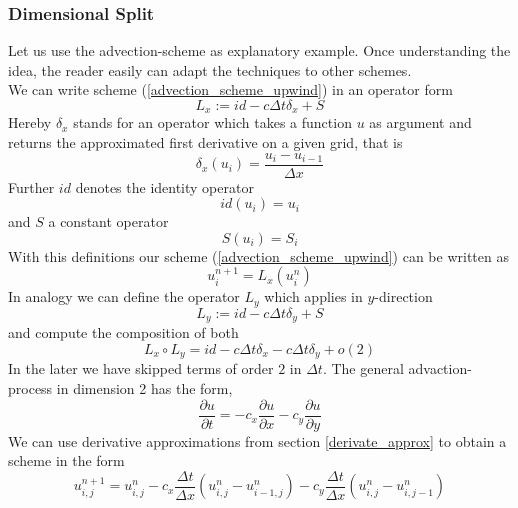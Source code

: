 \documentclass[]{article}
\begin{document}
\subsubsection{Dimensional Split}
Let us use the advection-scheme as explanatory example. Once understanding the idea, the reader easily can adapt the techniques to other schemes.\\
We can write scheme (\ref{advection_scheme_upwind}) in an operator form
\begin{equation*}
L_{x} := id - c\Delta t \delta_{x}+S
\end{equation*}
Hereby $\delta_{x}$ stands for an operator which takes a function $u$ as argument and 
returns the approximated first derivative on a given grid, that is
\begin{equation*}
\delta_{x}(u_{i}) = \frac{u_{i}-u_{i-1}}{\Delta x}
\end{equation*}
Further $id$ denotes the identity operator
\begin{equation*}
id(u_{i})=u_{i}
\end{equation*}
 and $S$ a constant operator
\begin{equation*}
S(u_{i})=S_{i}
\end{equation*}
With this definitions our scheme (\ref{advection_scheme_upwind}) can be written as
\begin{equation*}
u^{n+1}_{i} = L_{x}(u^{n}_{i})
\end{equation*}
In analogy we can define the operator $L_{y}$ which applies in $y$-direction
\begin{equation*}
L_{y}:=id - c\Delta t \delta_{y}+S
\end{equation*}
and compute the composition of both
\begin{equation} \label{L_x_comp_L_y}
L_{x}\circ L_{y}=id-c\Delta t\delta_{x}-c\Delta t\delta_{y}+o(2)
\end{equation}
In the later we have skipped terms of order $2$ in $\Delta t$.
The general advaction-process in dimension 2 has the form,
\begin{equation*}
\frac{\partial u}{\partial t} = -c_{x}\frac{\partial u}{\partial x}-c_{y} \frac{\partial u}{\partial y}
\end{equation*}
We can use derivative approximations from section \ref{derivate_approx} to obtain a scheme in the form
\begin{equation} \label{L_xy_scheme}
u_{i,j}^{n+1}=u_{i,j}^{n}-c_{x}\frac{\Delta t}{\Delta x}(u_{i,j}^{n}-u_{i-1,j}^{n})
-c_{y}\frac{\Delta t}{\Delta x}(u_{i,j}^{n}-u_{i,j-1}^{n})
\end{equation}
\end{document}
